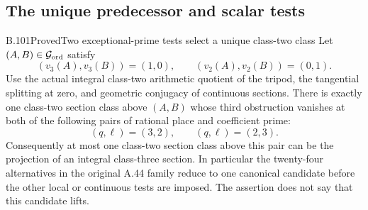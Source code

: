 \subsection{The unique predecessor and scalar tests}

\begin{result}{B.101}{Proved}{Two exceptional-prime tests select a unique class-two class}
Let $(A,B)\in\mathcal G_{\rm ord}$ satisfy
\[
(v_3(A),v_3(B))=(1,0),\qquad
(v_2(A),v_2(B))=(0,1).
\]
Use the actual integral class-two arithmetic quotient of the tripod,
the tangential splitting at zero, and geometric conjugacy of continuous
sections. There is exactly one class-two section class above $(A,B)$
whose third obstruction vanishes at both of the following pairs of
rational place and coefficient prime:
\[
(q,\ell)=(3,2),\qquad(q,\ell)=(2,3).
\]
Consequently at most one class-two section class above this pair can
be the projection of an integral class-three section. In particular
the twenty-four alternatives in the original A.44 family reduce to
one canonical candidate before the other local or continuous tests
are imposed. The assertion does not say that this candidate lifts.
\end{result}
